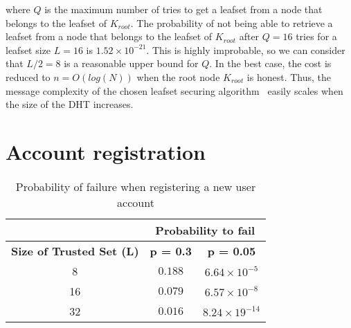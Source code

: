 \begin{enumerate}
      where $Q$ is the maximum number of tries to get a leafset from a node
that belongs to the leafset of $K_{root}$. The probability of not being able to
retrieve a leafset from a node that belongs to the leafset of $K_{root}$ after
$Q = 16$ tries for a leafset size $ L = 16$ is $1.52 \times 10^{-21} $. This is
highly improbable, so we can consider that $L/2 = 8$ is a reasonable upper
bound for $Q$. 
      In the best case, the cost is reduced to $n = O(log(N))$ when the root
node $K_{root}$ is honest. Thus, the message complexity of the chosen leafset
securing algorithm~\cite{p2p_certification} easily scales when the size of the
DHT increases.


  \end{enumerate}

%

\section{Account registration}
\label{sec:eval_account_registration}
  \begin{table}
    \centering
    \footnotesize
    \begin{tabular}{|c|c|c|}
      \cline{2-3}
      \multicolumn{1}{c|}{}&  \multicolumn{2}{c|}{\textbf{Probability to fail}} \\ \cline{2-3}
      \hline
      \textbf{Size of Trusted Set (L)} & \textbf{p = 0.3} & \textbf{p = 0.05} \\
      \hline \hline
      8 &  $0.188$ & $6.64 \times 10^{-5}$ \\
      \hline
      16 & $0.079$ & $6.57 \times 10^{-8}$  \\
      \hline
      32 & $0.016$ & $8.24 \times 19^{-14}$  \\
      \hline
    \end{tabular}
    \caption{Probability of failure when registering a new user account}
    \label{tab:p_account_registration}
  \end{table}
  
